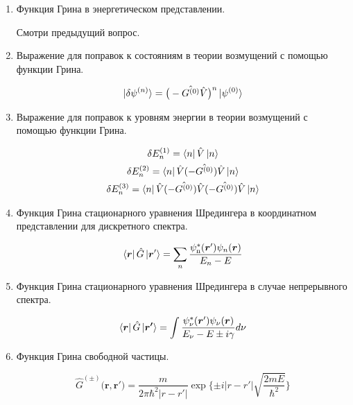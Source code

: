 \documentclass{article}
\begin{document}
\begin{enumerate}
		\item {Функция Грина в энергетическом представлении.}
		
		Смотри предыдущий вопрос.
		
		\item {Выражение для поправок к состояниям в теории возмущений с помощью функции Грина.}
		
		\begin{equation}
			\ket{\delta\psi^{(n)}}=\big(-\hat{G^{(0)}}\hat{V}\big)^{n}\ket{\psi^{(0)}}
		\end{equation}
		
		\item {Выражение для поправок к уровням энергии в теории возмущений с помощью функции Грина.}
		
		\begin{gather}
			\delta E_{n}^{(1)}=\bra{n}\hat{V}\ket{n} \\
\delta E_{n}^{(2)}=\bra{n}\hat{V}(-\hat{G^{(0)}})\hat{V}\ket{n}
\\
\delta E_{n}^{(3)}=\bra{n}\hat{V}(-\hat{G^{(0)}})\hat{V}(-\hat{G^{(0)}})\hat{V}\ket{n}
		\end{gather}
		
		\item {Функция Грина стационарного уравнения Шредингера в координатном представлении для дискретного спектра.}
		
		\begin{equation}
			\bra{\boldsymbol{r}}\hat{G}\ket{\boldsymbol{r}'}=\sum_{n}\frac{\psi_{\text{n}}^{*}(\boldsymbol{r}')\psi_{n}(\boldsymbol{r})}{E_{n}-E}
		\end{equation}
		
		\item {Функция Грина стационарного уравнения Шредингера в случае непрерывного спектра.}		
		
		\begin{equation}
			\bra{\boldsymbol{r}}\hat{G}\ket{\boldsymbol{r'}}=\int\frac{\psi_{\nu}^{*}(\boldsymbol{r}')\psi_{\nu}(\boldsymbol{r})}{E_{\nu}-E\pm i\gamma}d\nu
		\end{equation}
		
		\item {Функция Грина свободной частицы.}	
		
		\begin{equation}
			\hat{G}^{(\pm)}(\boldsymbol{r,r')}=\frac{m}{2\pi\hbar^{2}|r-r'|}\exp\{\pm i|r-r'|\sqrt{\frac{2mE}{\hbar^{2}}}\}
		\end{equation}
		

\end{enumerate}
\end{document}
